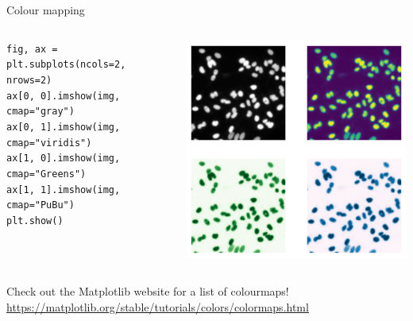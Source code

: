 \documentclass[9pt, aspectratio=169]{beamer}
\begin{document}
\begin{frame}
    {Colour mapping}
    \begin{columns}
        \begin{column}{0.6\textwidth}
            \begin{codebox}
                \texttt{fig, ax = plt.subplots(ncols=2, nrows=2)\\
                ax[0, 0].imshow(img, cmap="gray")\\
                ax[0, 1].imshow(img, cmap="viridis")\\
                ax[1, 0].imshow(img, cmap="Greens")\\
                ax[1, 1].imshow(img, cmap="PuBu")\\
                plt.show()}
            \end{codebox}
        \end{column}
        \begin{column}{0.4\textwidth}
            \includegraphics[width=\textwidth]{nuclei_cmapped.png}
        \end{column}
    \end{columns}
    \centering

    Check out the Matplotlib website for a list of colourmaps! \url{https://matplotlib.org/stable/tutorials/colors/colormaps.html}

\end{frame}
\end{document}
